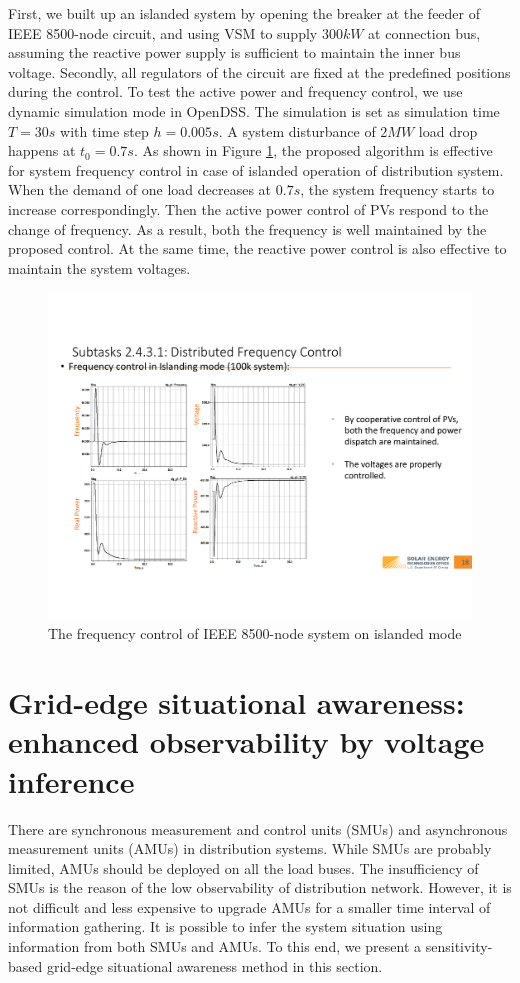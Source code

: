 \documentclass{article}
\begin{document}
First, we built up an islanded system by opening the breaker at the feeder of IEEE 8500-node circuit, and using VSM to supply $300kW$ at connection bus, assuming the reactive power supply is sufficient to maintain the inner bus voltage. Secondly, all regulators of the circuit are fixed at the predefined positions during the control. 
To test the active power and frequency control, we use dynamic simulation mode in OpenDSS. The simulation is set as simulation time $T=30s$ with time step $h=0.005s$. A system disturbance of $2MW$ load drop happens at $t_0=0.7s$. As shown in Figure \ref{fig:frslts}, the proposed algorithm is effective for system frequency control in case of islanded operation of distribution system. When the demand of one load decreases at $0.7s$, the system frequency starts to increase correspondingly. Then the active power control of PVs respond to the change of frequency. As a result, both the frequency is well maintained by the proposed control. At the same time, the reactive power control is also effective to maintain the system voltages.
\begin{figure}[ht]
    \centering
    \includegraphics[width=\linewidth]{pics/frslts.pdf}
    \caption{The frequency control of IEEE 8500-node system on islanded mode }
    \label{fig:frslts}
\end{figure}

\section{Grid-edge situational awareness: enhanced observability by voltage inference}\label{sed:gridedge}
There are synchronous measurement and control units (SMUs) and asynchronous measurement units (AMUs) in distribution systems. While SMUs are probably limited, AMUs should be deployed on all the load buses. The insufficiency of SMUs is the reason of the low observability of distribution network. However, it is not difficult and less expensive to upgrade AMUs for a smaller time interval of information gathering. It is possible to infer the system situation using information from both SMUs and AMUs. To this end, we present a sensitivity-based grid-edge situational awareness method in this section.  
\end{document}
